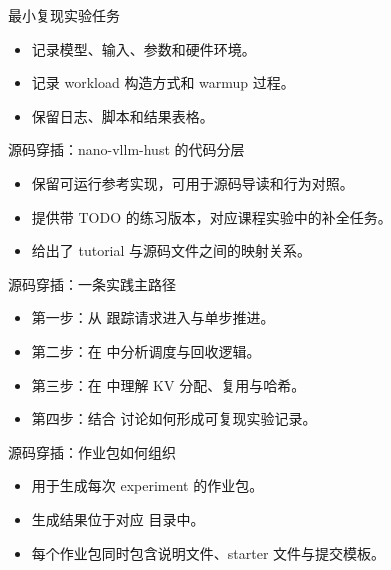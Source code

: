 \begin{frame}{最小复现实验任务}
  \begin{itemize}
    \item 记录模型、输入、参数和硬件环境。
    \item 记录 workload 构造方式和 warmup 过程。
    \item 保留日志、脚本和结果表格。
  \end{itemize}
\end{frame}

\begin{frame}{源码穿插：nano-vllm-hust 的代码分层}
  \begin{itemize}
    \item \texttt{} 保留可运行参考实现，可用于源码导读和行为对照。
    \item \texttt{} 提供带 TODO 的练习版本，对应课程实验中的补全任务。
    \item \texttt{} 给出了 tutorial 与源码文件之间的映射关系。
  \end{itemize}
\end{frame}

\begin{frame}{源码穿插：一条实践主路径}
  \begin{itemize}
    \item 第一步：从 \texttt{} 跟踪请求进入与单步推进。
    \item 第二步：在 \texttt{} 中分析调度与回收逻辑。
    \item 第三步：在 \texttt{} 中理解 KV 分配、复用与哈希。
    \item 第四步：结合 \texttt{} 讨论如何形成可复现实验记录。
  \end{itemize}
\end{frame}

\begin{frame}{源码穿插：作业包如何组织}
  \begin{itemize}
    \item \texttt{} 用于生成每次 experiment 的作业包。
    \item 生成结果位于对应 \texttt{} 目录中。
    \item 每个作业包同时包含说明文件、starter 文件与提交模板。
  \end{itemize}
\end{frame}

